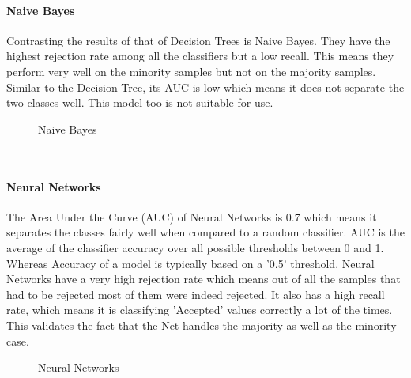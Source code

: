 \documentclass[conference]{IEEEtran}
\begin{document}
\paragraph{\textbf{Naive Bayes}}
Contrasting the results of that of Decision Trees is Naive Bayes. They have the highest rejection rate among all the classifiers but a low recall. 
This means they perform very well on the minority samples but not on the majority samples. Similar to the Decision Tree, its AUC is low which means it does not separate the two classes well. This model too is not suitable for use. 
\begin{figure}[h]%
    \centering
    \qquad
    \caption{Naive Bayes}%
    \label{fig:}%
\end{figure}
\\
\paragraph{\textbf{Neural Networks}}
The Area Under the Curve (AUC) of Neural Networks is 0.7 which means it separates the classes fairly well when compared to a random classifier. AUC is the average of the classifier accuracy over all possible thresholds between 0 and 1. Whereas Accuracy of a model is typically based on a '0.5' threshold. 
Neural Networks have a very high rejection rate which means out of all the samples that had to be rejected most of them were indeed rejected. It also has a high recall rate, which means it is classifying 'Accepted' values correctly a lot of the times. This validates the fact that the Net handles the majority as well as the minority case. 
\begin{figure}[h]%
    \centering
    \qquad
    \caption{Neural Networks}%
    \label{fig:}%
\end{figure}
\end{document}
